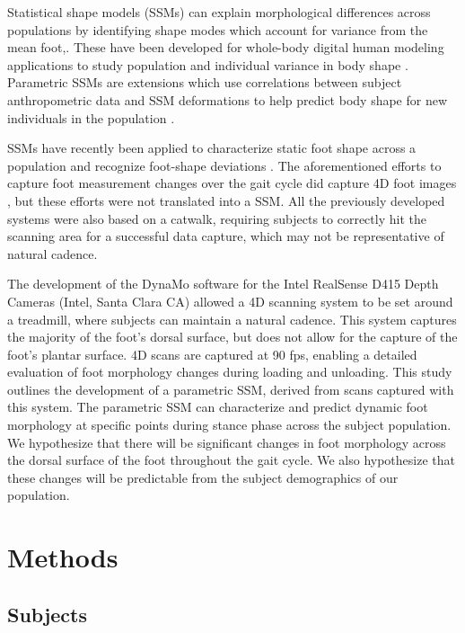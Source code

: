 \documentclass[preprint]{elsarticle}
\begin{document}
Statistical shape models (SSMs) can explain morphological differences across populations by identifying shape modes which account for variance from the mean foot,.
These have been developed for whole-body digital human modeling applications to study population and individual variance in body shape \citep{Allen2003, Anguelov2005, Reed2014, Park2015a, Park2017}.
Parametric SSMs are extensions which use correlations between subject anthropometric data and SSM deformations to help predict body shape for new individuals in the population \citep{Park2015a, Park2017}.

SSMs have recently been applied to characterize static foot shape across a population \citep{Conrad2019} and recognize foot-shape deviations \citep{Stankovic2020}.
The aforementioned efforts to capture foot measurement changes over the gait cycle did capture 4D foot images \citep{Barisch-Fritz2014, Grau2018}, but these efforts were not translated into a SSM.
All the previously developed systems were also based on a catwalk, requiring subjects to correctly hit the scanning area for a successful data capture, which may not be representative of natural cadence.

The development of the DynaMo software \citep{Boppana2019} for the Intel RealSense D415 Depth Cameras (Intel, Santa Clara CA) allowed a 4D scanning system to be set around a treadmill, where subjects can maintain a natural cadence.
This system captures the majority of the foot's dorsal surface, but does not allow for the capture of the foot's plantar surface.
4D scans are captured at 90 fps, enabling a detailed evaluation of foot morphology changes during loading and unloading.
This study outlines the development of a parametric SSM, derived from scans captured with this system.
The parametric SSM can characterize and predict dynamic foot morphology at specific points during stance phase across the subject population.
We hypothesize that there will be significant changes in foot morphology across the dorsal surface of the foot throughout the gait cycle.
We also hypothesize that these changes will be predictable from the subject demographics of our population.

\hypertarget{methods}{%
\section{Methods}\label{methods}}

\hypertarget{subjects}{%
\subsection{Subjects}\label{subjects}}
\end{document}
